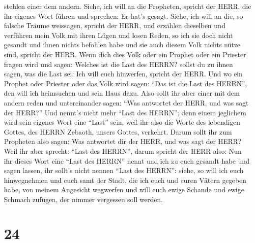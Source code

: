 stehlen einer dem andern.  Siehe, ich will an die
Propheten, spricht der HERR, die ihr eigenes Wort führen und sprechen:
Er hat's gesagt.  Siehe, ich will an die, so falsche Träume
weissagen, spricht der HERR, und erzählen dieselben und verführen mein
Volk mit ihren Lügen und losen Reden, so ich sie doch nicht gesandt und
ihnen nichts befohlen habe und sie auch diesem Volk nichts nütze sind,
spricht der HERR.  Wenn dich dies Volk oder ein Prophet
oder ein Priester fragen wird und sagen: Welches ist die Last des HERRN?
sollst du zu ihnen sagen, was die Last sei: Ich will euch hinwerfen,
spricht der HERR.  Und wo ein Prophet oder Priester oder
das Volk wird sagen: ``Das ist die Last des HERRN'', den will ich
heimsuchen und sein Haus dazu.  Also sollt ihr aber einer
mit dem andern reden und untereinander sagen: ``Was antwortet der HERR,
und was sagt der HERR?''  Und nennt's nicht mehr ``Last des
HERRN''; denn einem jeglichem wird sein eigenes Wort eine ``Last'' sein,
weil ihr also die Worte des lebendigen Gottes, des HERRN Zebaoth, unsers
Gottes, verkehrt.  Darum sollt ihr zum Propheten also
sagen: Was antwortet dir der HERR, und was sagt der HERR? 
Weil ihr aber sprecht: ``Last des HERRN'', darum spricht der HERR also:
Nun ihr dieses Wort eine ``Last des HERRN'' nennt und ich zu euch
gesandt habe und sagen lassen, ihr sollt's nicht nennen ``Last des
HERRN'':  siehe, so will ich euch hinwegnehmen und euch
samt der Stadt, die ich euch und euren Vätern gegeben habe, von meinem
Angesicht wegwerfen  und will euch ewige Schande und ewige
Schmach zufügen, der nimmer vergessen soll werden.

\hypertarget{section-23}{%
\section{24}\label{section-23}}

